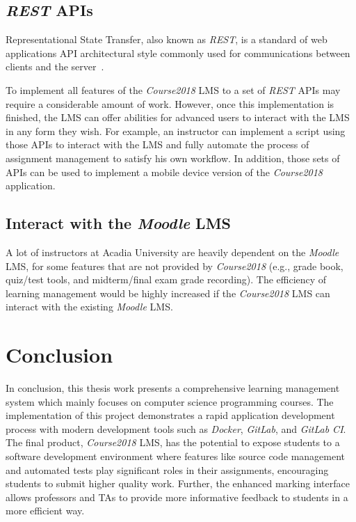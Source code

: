 \subsection{\emph{REST} APIs}
Representational State Transfer, also known as \emph{REST}, is a standard of
web applications API architectural style commonly used for communications
between clients and the server~\citep[Chapter 5]{REST}.

To implement all features of the \emph{Course2018} LMS to a set of \emph{REST} APIs
may require a considerable amount of work. However, once this implementation is
finished, the LMS can offer abilities for advanced users to interact with the
LMS in any form they
wish. For example, an instructor can implement a script using those APIs to
interact with the LMS and fully automate the process of assignment management
to satisfy his own workflow. In addition, those sets of APIs can be used
to implement a mobile device version of the \emph{Course2018} application.

\subsection{Interact with the \emph{Moodle} LMS}
A lot of instructors at Acadia University are heavily dependent on the
\emph{Moodle} LMS, for some features that are not provided by
\emph{Course2018} (e.g., grade book, quiz/test tools, and midterm/final
exam grade recording). The efficiency of learning management would be
highly increased if the \emph{Course2018} LMS can interact with the existing
\emph{Moodle} LMS\null.


\section{Conclusion}
In conclusion, this thesis work presents a comprehensive
learning management system which mainly focuses on computer science
programming courses. The implementation of this project demonstrates
a rapid application development process with modern development tools
such as \emph{Docker}, \emph{GitLab}, and \emph{GitLab CI}\null.
The final product, \emph{Course2018} LMS, has the potential to expose
students to a software development environment where features like source
code management and
automated tests play significant roles in their assignments, encouraging
students to submit higher quality work.
Further,
the enhanced marking interface allows professors and TAs to provide more
informative feedback to students in a more efficient way.
